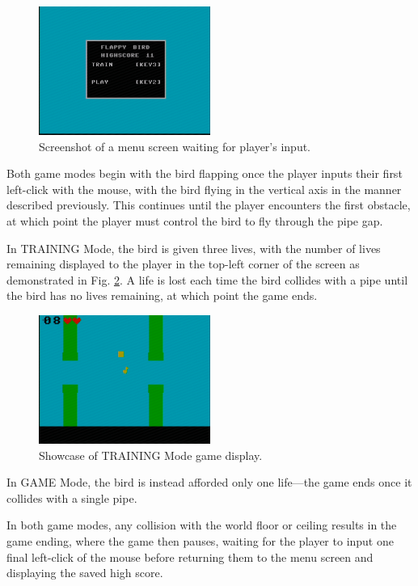 \documentclass[conference]{IEEEtran}
\begin{document}
\begin{figure}[htbp]
    \centerline{\includegraphics[width=0.5\textwidth]{menu-screen.png}}
    \caption{Screenshot of a menu screen waiting for player's input.}
    \label{fig:menu-screen}
\end{figure}

Both game modes begin with the bird flapping once the player inputs their first left-click with the mouse, with the bird flying in the vertical axis in the manner described previously. This continues until the player encounters the first obstacle, at which point the player must control the bird to fly through the pipe gap.

In TRAINING Mode, the bird is given three lives, with the number of lives remaining displayed to the player in the top-left corner of the screen as demonstrated in Fig. \ref{fig:training-mode}. A life is lost each time the bird collides with a pipe until the bird has no lives remaining, at which point the game ends.

\begin{figure}[htbp]
    \centerline{\includegraphics[width=0.5\textwidth]{training-mode.png}}
    \caption{Showcase of TRAINING Mode game display.}
    \label{fig:training-mode}
\end{figure}

In GAME Mode, the bird is instead afforded only one life—the game ends once it collides with a single pipe.

In both game modes, any collision with the world floor or ceiling results in the game ending, where the game then pauses, waiting for the player to input one final left-click of the mouse before returning them to the menu screen and displaying the saved high score.
\end{document}
